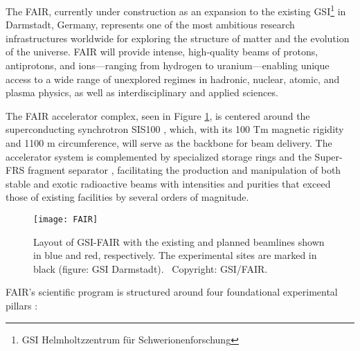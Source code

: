 The \gls{FAIR}, currently under construction as an expansion to the existing GSI\footnote{GSI Helmholtzzentrum für Schwerionenforschung} in Darmstadt, Germany, represents one of the most ambitious research infrastructures worldwide for exploring the structure of matter and the evolution of the universe. \gls{FAIR} will provide intense, high-quality beams of protons, antiprotons, and ions—ranging from hydrogen to uranium—enabling unique access to a wide range of unexplored regimes in hadronic, nuclear, atomic, and plasma physics, as well as interdisciplinary and applied sciences.

The \gls{FAIR} accelerator complex, seen in Figure \ref{fig:FAIRlayout}, is centered around the superconducting synchrotron SIS100 \cite{sis100_fair_2020}, which, with its 100 Tm magnetic rigidity and 1100 m circumference, will serve as the backbone for beam delivery. The accelerator system is complemented by specialized storage rings and the Super-FRS fragment separator \cite{superfrs_status_2008}, facilitating the production and manipulation of both stable and exotic radioactive beams with intensities and purities that exceed those of existing facilities by several orders of magnitude.

\begin{figure}[H]
	\centering
	\texttt{[image: FAIR]}
	\caption{Layout of GSI-FAIR with the existing and planned beamlines shown in blue and red, respectively. The experimental sites are marked in black (figure: GSI Darmstadt). \textcopyright ~Copyright: GSI/FAIR.}
	\label{fig:FAIRlayout}
\end{figure}

\gls{FAIR}'s scientific program is structured around four foundational experimental pillars \cite{123_FAIR,rosner_future_2007,stoecker_fair_2011}:

